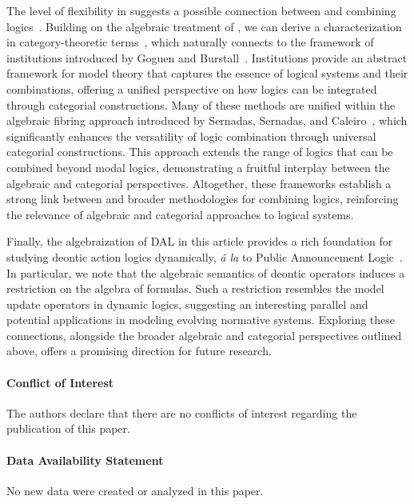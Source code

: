 The level of flexibility in  suggests a possible connection between \DAL and combining logics~\cite{sep-logic-combining}.
Building on the algebraic treatment of \DAL, we can derive a characterization in category-theoretic terms~\cite{MacLane98}, which naturally connects to the framework of institutions introduced by Goguen and Burstall~\cite{GoguenBurstall84,GoguenBurstall92}.
Institutions provide an abstract framework for model theory that captures the essence of logical systems and their combinations, offering a unified perspective on how logics can be integrated through categorial constructions.
Many of these methods are unified within the algebraic fibring approach introduced by Sernadas, Sernadas, and Caleiro~\cite{Sernadas1999}, which significantly enhances the versatility of logic combination through universal categorial constructions.
This approach extends the range of logics that can be combined beyond modal logics, demonstrating a fruitful interplay between the algebraic and categorial perspectives.
Altogether, these frameworks establish a strong link between \DAL and broader methodologies for combining logics, reinforcing the relevance of algebraic and categorial approaches to logical systems.

Finally, the algebraization of DAL in this article provides a rich foundation for studying deontic action logics dynamically, \emph{\'a la} to Public Announcement Logic~\cite{Plaza2007}.
In particular, we note that the algebraic semantics of deontic operators induces a restriction on the algebra of formulas.
Such a restriction resembles the model update operators in dynamic logics, suggesting an interesting parallel and potential applications in modeling evolving normative systems. Exploring these connections, alongside the broader algebraic and categorial perspectives outlined above, offers a promising direction for future research.

\paragraph{Conflict of Interest}

The authors declare that there are no conflicts of interest regarding the publication of this paper.

\paragraph{Data Availability Statement}

No new data were created or analyzed in this paper.

